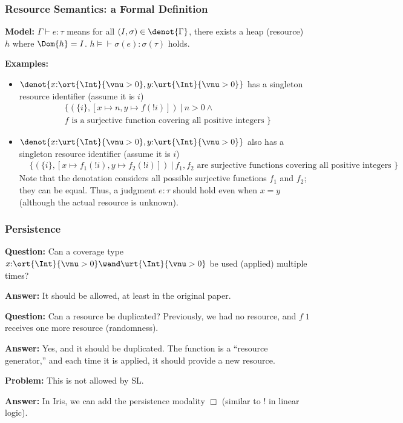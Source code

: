 \begin{frame}[fragile]
    \frametitle{Resource Semantics: a Formal Definition}

\textbf{Model:} $\Gamma \vdash e : \tau$ means for all $(I, \sigma) \in \denot{\Gamma}$, there exists a heap (resource) $h$ where $\Dom{h} = I$. $h \models \vdash \sigma(e) : \sigma(\tau)$ holds.

\textbf{Examples:}
\begin{itemize}
    \item $\denot{x{:}\ort{\Int}{\vnu > 0}, y{:}\urt{\Int}{\vnu > 0}}$ has a singleton resource identifier (assume it is $i$)
    \begin{align*}
        &\{(\{i\}, [x\mapsto n, y\mapsto f(!i)]) ~|~ 
        n > 0 \land 
        \\&f \text{ is a surjective function covering all positive integers } \} 
    \end{align*}
    \item $\denot{x{:}\urt{\Int}{\vnu > 0}, y{:}\urt{\Int}{\vnu > 0}}$ also has a singleton resource identifier (assume it is $i$)
    \begin{align*}
        &\{(\{i\}, [x\mapsto f_1(!i), y\mapsto f_2(!i)]) ~|~ 
        f_1, f_2 \text{ are surjective functions covering all positive integers } \} 
    \end{align*}
    Note that the denotation considers all possible surjective functions $f_1$ and $f_2$; they can be equal. Thus, a judgment $e : \tau$ should hold even when $x = y$ (although the actual resource is unknown).
\end{itemize}
\end{frame}

\begin{frame}[fragile]
    \frametitle{Persistence}

\textbf{Question:} Can a coverage type $x{:}\ort{\Int}{\vnu > 0}\wand\urt{\Int}{\vnu > 0}$ be used (applied) multiple times?

\textbf{Answer:} It should be allowed, at least in the original paper.

\textbf{Question:} Can a resource be duplicated? Previously, we had no resource, and $f\;1$ receives one more resource (randomness).

\textbf{Answer:} Yes, and it should be duplicated. The function is a ``resource generator,'' and each time it is applied, it should provide a new resource.

\textbf{Problem:} This is not allowed by SL.

\textbf{Answer:} In Iris, we can add the persistence modality $\Box$ (similar to $!$ in linear logic).

\end{frame}

